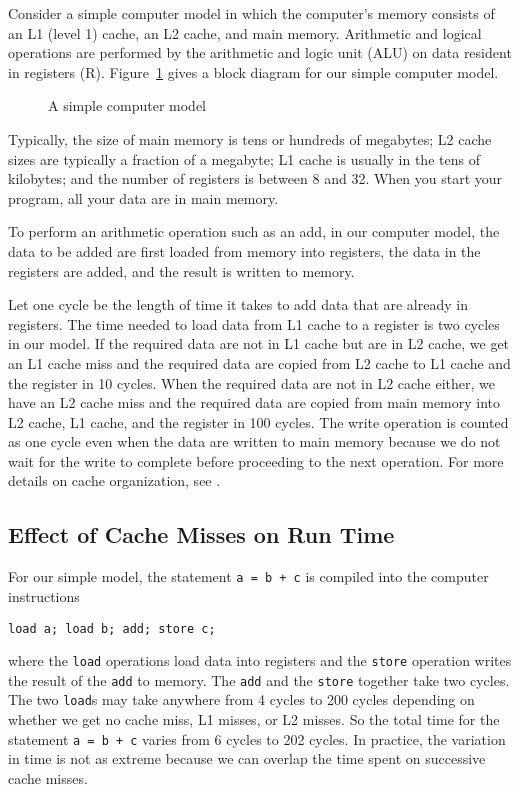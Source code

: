 Consider a simple computer model in which
the computer's memory consists of
an L1 (level 1) cache, an L2 cache, and main memory.
Arithmetic and logical operations are performed by
the arithmetic and logic unit (ALU) on data resident in
registers (R). Figure~\ref{fig2:cache} gives a block diagram for our
simple computer model.


\begin{figure}
\centerline{\protect{}}
\caption{A simple computer model
\label{fig2:cache}}
\end{figure}

Typically, the size of main memory is tens or hundreds of megabytes;
L2 cache sizes are typically a fraction of a megabyte; L1 cache is usually
in the tens of kilobytes; and the number of registers is between
8 and 32. When you start your program, all your data are in main memory.


To perform an arithmetic operation such as an add, in our computer model,
the data to be
added are first loaded from memory into registers, the data in the
registers are added, and the result is written to memory.

Let one cycle be the length of time it takes to add data that
are already in registers. The time needed to load data
from L1 cache to a register is two cycles in our model.
If the required data are not in L1 cache but are in L2 cache, we get
an L1 cache miss and the required data are copied from L2 cache to
L1 cache and the register in 10 cycles. When the required data
are not in L2 cache either, we have an L2 cache miss and the required
data are copied from main memory into L2 cache, L1 cache, and the
register in 100 cycles.
The write operation is counted as one cycle even when the data
are written to main memory because we do not wait for the write to
complete before proceeding to the next operation.
For more details on cache organization, see \cite{henn}.

\subsection{Effect of Cache Misses on Run Time}\label{sec2:miss}
For our simple model, the statement {\tt a = b + c}
is compiled into the computer instructions

\begin{verbatim}
load a; load b; add; store c;
\end{verbatim}
where the {\tt load} operations load data into registers and the
{\tt store} operation writes the result of the {\tt add} to memory.
The {\tt add} and the {\tt store} together take two cycles.
The two {\tt load}s may take anywhere from 4 cycles to 200 cycles
depending on whether we get no cache miss, L1 misses, or L2 misses.
So the total time for the statement {\tt a = b + c} varies
from 6 cycles to 202 cycles. In practice, the variation in time is not
as extreme because we can overlap the time spent on successive
cache misses.

